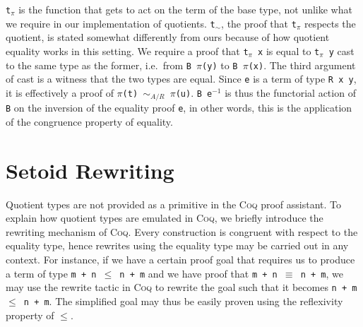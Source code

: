 \documentclass[12pt,twoside,maitrise]{dms}
\theoremstyle{definition}
\numberwithin{equation}{section}
\numberwithin{table}{chapter}
\numberwithin{figure}{chapter}
\newcommand\kw[1] {\textsf{#1}}
\newcommand\id[1] {\texttt{#1}}
\newcommand\fn[1] {\texttt{#1}}
\def\Coq{\textsc{Coq}\xspace}
\begin{document}
\id{t$_\pi$} is the function that gets to act on the term of the base type, not
unlike what we require in our implementation of quotients. \id{t$_\sim$}, the
proof that \id{t$_\pi$} respects the quotient, is stated somewhat differently
from ours because of how quotient equality works in this setting. We require a
proof that \fn{t$_\pi$ x} is equal to \fn{t$_\pi$ y} cast to the same type as
the former, i.e.\ from \fn{B $\pi$(y)} to \fn{B $\pi$(x)}. The third argument of
\kw{cast} is a witness that the two types are equal. Since \id{e} is a term of
type \fn{R x y}, it is effectively a proof of \fn{$\pi$(t) $\sim_{A/R}$
  $\pi$(u)}. \fn{B e$^{-1}$} is thus the functorial action of \id{B} on the
inversion of the equality proof \id{e}, in other words, this is the application
of the congruence property of equality.

\section{Setoid Rewriting}

Quotient types are not provided as a primitive in the \Coq{} proof assistant. To
explain how quotient types are emulated in \Coq{}, we briefly introduce the
rewriting mechanism of \Coq{}. Every construction is congruent with respect to
the equality type, hence rewrites using the equality type may be carried out in
any context. For instance, if we have a certain proof goal that requires us to
produce a term of type \fn{m + n $\le$ n + m} and we have proof that \fn{m + n
  $\equiv$ n + m}, we may use the \kw{rewrite} tactic in \Coq{} to rewrite the
goal such that it becomes \fn{n + m $\le$ n + m}. The simplified goal may thus
be easily proven using the reflexivity property of $\le$.
\end{document}
